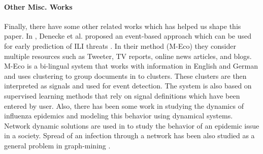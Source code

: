 \paragraph{Other Misc. Works}
Finally, there have some other related works which has helped us shape this paper. 
In \cite{ref3}, Denecke et al.
proposed an event-based approach which can be used for early prediction
of ILI threats \cite{ref3}. In their method (M-Eco) they consider
multiple resources such as Tweeter, TV reports, online news articles,
and blogs. M-Eco is a bi-lingual system that works with information in
English and German and uses clustering to group documents in to
clusters. These clusters are then interpreted as signals and used for
event detection. The system is also based on supervised learning methods
that rely on signal definitions which have been entered by user.
Also, there has been some work in studying the dynamics of influenza epidemics and
modeling this behavior using dynamical systems. Network dynamic solutions are used in
\cite{ref11} to study the behavior of an epidemic issue in a society.
Spread of an infection through a network has been also studied as a
general problem in graph-mining \cite{ref13} \cite{ref14}. 
 
